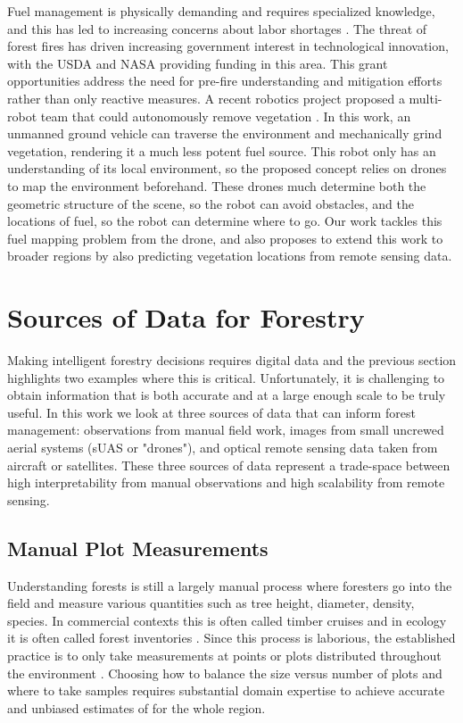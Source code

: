 Fuel management is physically demanding and requires specialized knowledge, and this has led to increasing concerns about labor shortages \cite{CommisionGlobalDivision}. 
The threat of forest fires has driven increasing government interest in technological innovation, with the USDA \cite{USDA2023USDAGrant} and NASA \cite{SPSO2023Research2023} providing funding in this area. This grant opportunities address the need for pre-fire understanding and mitigation efforts rather than only reactive measures.
A recent robotics project proposed a multi-robot team that could autonomously remove vegetation \cite{couceiro2019semfire}. In this work, an unmanned ground vehicle can traverse the environment and mechanically grind vegetation, rendering it a much less potent fuel source. This robot only has an understanding of its local environment, so the proposed concept relies on drones to map the environment beforehand. These drones much determine both the geometric structure of the scene, so the robot can avoid obstacles, and the locations of fuel, so the robot can determine where to go. Our work tackles this fuel mapping problem from the drone, and also proposes to extend this work to broader regions by also predicting vegetation locations from remote sensing data. 


\section{Sources of Data for Forestry}
Making intelligent forestry decisions requires digital data \cite{digitalForestry2009} and the previous section highlights two examples where this is critical. Unfortunately, it is challenging to obtain information that is both accurate and at a large enough scale to be truly useful. In this work we look at three sources of data that can inform forest management: observations from manual field work, images from small uncrewed aerial systems (sUAS or "drones"), and optical remote sensing data taken from aircraft or satellites. These three sources of data represent a trade-space between high interpretability from manual observations and high scalability from remote sensing.

\subsection{Manual Plot Measurements}
Understanding forests is still a largely manual process where foresters go into the field and measure various quantities such as tree height, diameter, density, species. In commercial contexts this is often called timber cruises \cite{ServiceFSHHANDBOOK} and in ecology it is often called forest inventories \cite{USForestServiceDepartmentofAgriculture2016FORESTPLOTS}. Since this process is laborious, the established practice is to only take measurements at points or plots distributed throughout the environment \cite{Town2018ForestryMethods}. Choosing how to balance the size versus number of plots and where to take samples requires substantial  domain expertise to achieve accurate and unbiased estimates of for the whole region.

